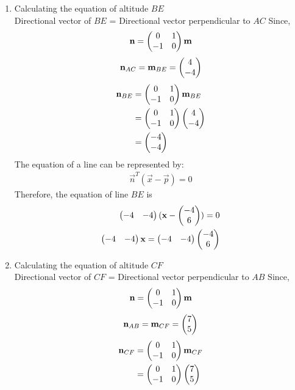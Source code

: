 \documentclass[12pt]{article}
\begin{document}
\begin{enumerate}
\item Calculating the equation of altitude $BE$\\
Directional vector of $BE$ = Directional vector perpendicular to $AC$
Since,
\begin{align}
\mathbf{n} &= \begin{pmatrix}0&1 \\ -1&0\end{pmatrix}\mathbf{m}\\
\end{align}
\begin{align}
\mathbf{n}_{AC}=\mathbf{m}_{BE}=\begin{pmatrix}4\\-4\end{pmatrix}
\end{align}
\begin{align}
\mathbf{n}_{BE} &= \begin{pmatrix}0&1 \\ -1&0\end{pmatrix}\mathbf{m}_{BE}\\
&= \begin{pmatrix}0&1 \\ -1&0\end{pmatrix}\begin{pmatrix}4 \\ -4\end{pmatrix}\\
&= \begin{pmatrix}-4 \\ -4\end{pmatrix}
\end{align}
The equation of a line can be represented by:
\begin{align}
\vec{n}^{T}(\vec{x}-\vec{p})=0
\end{align}
Therefore, the equation of line $BE$ is
\begin{align}
\begin{pmatrix}-4&-4\end{pmatrix}(\mathbf{x}-\begin{pmatrix}-4\\6\\\end{pmatrix})=0\\
\begin{pmatrix}-4&-4\end{pmatrix}\mathbf{x}=\begin{pmatrix}-4&-4\end{pmatrix}\begin{pmatrix}-4\\6\\\end{pmatrix}\\
\end{align}
\item Calculating the equation of altitude $CF$\\
Directional vector of $CF$ = Directional vector perpendicular to $AB$
Since,
\begin{align}
\mathbf{n} &= \begin{pmatrix}0&1 \\ -1&0\end{pmatrix}\mathbf{m}\\
\end{align}
\begin{align}
\mathbf{n}_{AB}=\mathbf{m}_{CF}=\begin{pmatrix}7\\5\end{pmatrix}
\end{align}
\begin{align}
\vec{n}_{CF} &= \myvec{0&1 \\ -1&0}\vec{m}_{CF}\\
&= \myvec{0&1 \\ -1&0}\myvec{7\\5}\\

\end{align}
\end{enumerate}
\end{document}

